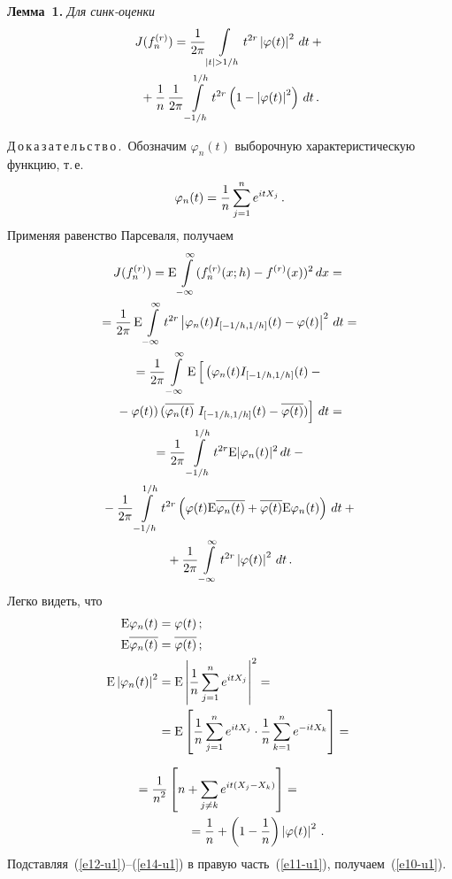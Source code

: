 \begin{multicols}{2}
\noindent
\textbf{Лемма~1.} \textit{Для синк-оценки}
\begin{multline}
J(f_n^{(r)})=\fr{1}{2\pi}\int\limits_{|t|>1/h}t^{2r}\left\vert\varphi(t)\right\vert^2\,dt+{}\\
{}+
\fr{1}{n}\,\fr{1}{2\pi}\int\limits_{-1/h}^{1/h}t^{2r}\left(1-
\left\vert\varphi(t)\right\vert^2\right)\,dt\,.
\label{e10-u1}
\end{multline}

\medskip

\noindent
Д\,о\,к\,а\,з\,а\,т\,е\,л\,ь\,с\,т\,в\,о\,.\ 
Обозначим $\varphi_n(t)$ выборочную характеристическую
функцию, т.\,е.\
$$
\varphi_n(t)=\displaystyle\frac{\displaystyle 1\mathstrut}{\displaystyle n\mathstrut}\sum\limits_{j=1}^ne^{itX_j}\,.
$$
Применяя равенство Парсеваля, получаем
\begin{multline}
J(f_n^{(r)})={\rm E}\int\limits_{-\infty}^\infty(f_n^{(r)}(x;h)-f^{(r)}(x))^2\,dx={}\\
{}=
\fr{1}{2\pi}\,
{\rm E}\int\limits_{-\infty}^\infty
t^{2r}\left\vert\varphi_n(t)I_{[-1/h,1/h]}(t)-\varphi(t)\right\vert^2\,dt={}\\
{}=
\fr{1}{2\pi}\int\limits_{-\infty}^\infty
{\rm E}\left[
\vphantom{\overline{\varphi(t)}}
\left(\varphi_n(t)I_{[-1/h,1/h]}(t)-{}\right.\right.\\
\left.\left.{}-\varphi(t)\right)
(\overline{\varphi_n(t)}\ I_{[-1/h,1/h]}(t)-
\overline{\varphi(t)})\right]\,dt={}\\
{}=\fr{1}{2\pi}\int\limits_{-1/h}^{1/h} t^{2r}{\rm E}|\varphi_n(t)|^2\,dt-{}\\
{}-
\fr{1}{2\pi}\int\limits_{-1/h}^{1/h} t^{2r}
\left(\varphi(t){\rm E}\overline{\varphi_n(t)}+
\overline{\varphi(t)}{\rm E}\varphi_n(t)\right)\,dt+{}\\
{}+
\fr{1}{2\pi}\int\limits_{-\infty}^\infty t^{2r}\left\vert\varphi(t)\right\vert^2\,dt\,.
\label{e11-u1}
\end{multline}
Легко видеть, что
\begin{align}
{\rm E}\varphi_n(t)&=\varphi(t)\,;\label{e12-u1}\\
{\rm E}\overline{\varphi_n(t)}&=\overline{\varphi(t)}\,;\label{e13-u1}\\
{\rm E}\left\vert\varphi_n(t)\right\vert^2&=
{\rm E}\left\vert\displaystyle\frac{\displaystyle 1\mathstrut}{\displaystyle n\mathstrut}\sum\limits_{j=1}^ne^{itX_j}\right\vert^2
={}\notag\\
&{}={\rm E}\left[\displaystyle\frac{\displaystyle 1\mathstrut}{\displaystyle n\mathstrut}\sum\limits_{j=1}^ne^{itX_j}\cdot\displaystyle\frac{\displaystyle 1\mathstrut}{\displaystyle n\mathstrut}
\sum\limits_{k=1}^ne^{-itX_k}\right]={}\notag
\end{align}

\noindent
\begin{align}
&{}=\fr{1}{n^2}\left[n+\sum\limits_{j\not=k}e^{it(X_j-X_k)}\right]={}\notag\\
&\hspace*{15mm}{}=
\fr{1}{n}+\left(1-\fr{1}{n}\right)\left\vert\varphi(t)\right\vert^2\,.
\label{e14-u1}
\end{align}
Подставляя~(\ref{e12-u1})--(\ref{e14-u1}) в правую часть~(\ref{e11-u1}), получаем~(\ref{e10-u1}).


\end{multicols}
